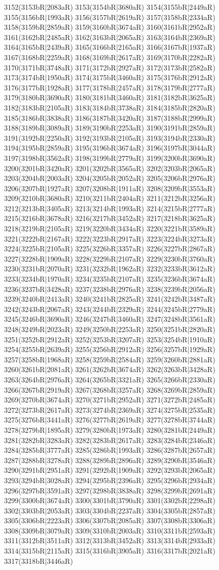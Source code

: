 3152(3153bR|2083aR) 3153(3154bR|3680aR) 3154(3155bR|2449aR) 3155(3156bR|1993aR) 3156(3157bR|2619aR) 3157(3158bR|2334aR) 3158(3159bR|2859aR) 3159(3160bR|3674aR) 3160(3161bR|2952aR) 3161(3162bR|2485aR) 3162(3163bR|2065aR) 3163(3164bR|2369aR) 3164(3165bR|2439aR) 3165(3166bR|2165aR) 3166(3167bR|1937aR) 3167(3168bR|2259aR) 3168(3169bR|2617aR) 3169(3170bR|2282aR) 3170(3171bR|3748aR) 3171(3172bR|2927aR) 3172(3173bR|2582aR) 3173(3174bR|1950aR) 3174(3175bR|3460aR) 3175(3176bR|2912aR) 3176(3177bR|1928aR) 3177(3178bR|2457aR) 3178(3179bR|2777aR) 3179(3180bR|3690aR) 3180(3181bR|3460aR) 3181(3182bR|3625aR) 3182(3183bR|2105aR) 3183(3184bR|3738aR) 3184(3185bR|2820aR) 3185(3186bR|3838aR) 3186(3187bR|3420aR) 3187(3188bR|2999aR) 3188(3189bR|3089aR) 3189(3190bR|2253aR) 3190(3191bR|2859aR) 3191(3192bR|2250aR) 3192(3193bR|2105aR) 3193(3194bR|2330aR) 3194(3195bR|2859aR) 3195(3196bR|3674aR) 3196(3197bR|3044aR) 3197(3198bR|3562aR) 3198(3199bR|2779aR) 3199(3200bR|3690aR) 3200(3201bR|3420aR) 3201(3202bR|3565aR) 3202(3203bR|2065aR) 3203(3204bR|2003aR) 3204(3205bR|2052aR) 3205(3206bR|2976aR) 3206(3207bR|1927aR) 3207(3208bR|1911aR) 3208(3209bR|3553aR) 3209(3210bR|3680aR) 3210(3211bR|2404aR) 3211(3212bR|3256aR) 3212(3213bR|3405aR) 3213(3214bR|1993aR) 3214(3215bR|2777aR) 3215(3216bR|3678aR) 3216(3217bR|3452aR) 3217(3218bR|3625aR) 3218(3219bR|2105aR) 3219(3220bR|3434aR) 3220(3221bR|3589aR) 3221(3222bR|2167aR) 3222(3223bR|2917aR) 3223(3224bR|3273aR) 3224(3225bR|2105aR) 3225(3226bR|3357aR) 3226(3227bR|2867aR) 3227(3228bR|1909aR) 3228(3229bR|2107aR) 3229(3230bR|3760aR) 3230(3231bR|2070aR) 3231(3232bR|1962aR) 3232(3233bR|3612aR) 3233(3234bR|1970aR) 3234(3235bR|2107aR) 3235(3236bR|3674aR) 3236(3237bR|3428aR) 3237(3238bR|2976aR) 3238(3239bR|2056aR) 3239(3240bR|2413aR) 3240(3241bR|2825aR) 3241(3242bR|3487aR) 3242(3243bR|2067aR) 3243(3244bR|2329aR) 3244(3245bR|2779aR) 3245(3246bR|3690aR) 3246(3247bR|3460aR) 3247(3248bR|3561aR) 3248(3249bR|2023aR) 3249(3250bR|2253aR) 3250(3251bR|2820aR) 3251(3252bR|2912aR) 3252(3253bR|3207aR) 3253(3254bR|1910aR) 3254(3255bR|2639aR) 3255(3256bR|2912aR) 3256(3257bR|1929aR) 3257(3258bR|1968aR) 3258(3259bR|2584aR) 3259(3260bR|2881aR) 3260(3261bR|2081aR) 3261(3262bR|3674aR) 3262(3263bR|3428aR) 3263(3264bR|2976aR) 3264(3265bR|3321aR) 3265(3266bR|2330aR) 3266(3267bR|2919aR) 3267(3268bR|3257aR) 3268(3269bR|2859aR) 3269(3270bR|3674aR) 3270(3271bR|2952aR) 3271(3272bR|2485aR) 3272(3273bR|2617aR) 3273(3274bR|2369aR) 3274(3275bR|2535aR) 3275(3276bR|3441aR) 3276(3277bR|2619aR) 3277(3278bR|3744aR) 3278(3279bR|1895aR) 3279(3280bR|1973aR) 3280(3281bR|2449aR) 3281(3282bR|3283aR) 3282(3283bR|2617aR) 3283(3284bR|2346aR) 3284(3285bR|3777aR) 3285(3286bR|1993aR) 3286(3287bR|2657aR) 3287(3288bR|3278aR) 3288(3289bR|2896aR) 3289(3290bR|3546aR) 3290(3291bR|2951aR) 3291(3292bR|1909aR) 3292(3293bR|2065aR) 3293(3294bR|3028aR) 3294(3295bR|2396aR) 3295(3296bR|2934aR) 3296(3297bR|3591aR) 3297(3298bR|3838aR) 3298(3299bR|2691aR) 3299(3300bR|3674aR) 3300(3301bR|3790aR) 3301(3302bR|2298aR) 3302(3303bR|2053aR) 3303(3304bR|2237aR) 3304(3305bR|2857aR) 3305(3306bR|2223aR) 3306(3307bR|2085aR) 3307(3308bR|3306aR) 3308(3309bR|3079aR) 3309(3310bR|2003aR) 3310(3311bR|2593aR) 3311(3312bR|3511aR) 3312(3313bR|3452aR) 3313(3314bR|2933aR) 3314(3315bR|2115aR) 3315(3316bR|3905aR) 3316(3317bR|2021aR) 3317(3318bR|3446aR) 